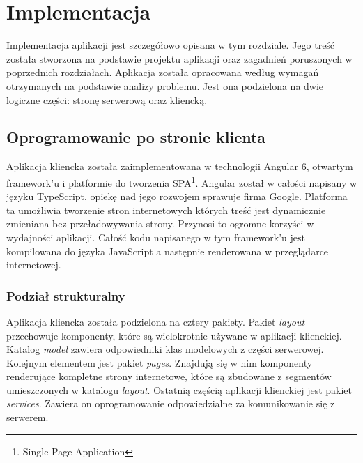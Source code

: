 \documentclass[12pt, twoside]{report}
\begin{document}
\chapter{Implementacja}
Implementacja aplikacji jest szczegółowo opisana w tym rozdziale. Jego treść została stworzona na podstawie projektu aplikacji oraz zagadnień poruszonych w poprzednich rozdziałach. Aplikacja została opracowana według wymagań otrzymanych na podstawie analizy problemu. Jest ona podzielona na dwie logiczne części: stronę serwerową oraz kliencką. 

\section{Oprogramowanie po stronie klienta}
Aplikacja kliencka została zaimplementowana w technologii Angular 6, otwartym framework'u i platformie do tworzenia SPA\footnote{Single Page Application}. Angular został w całości napisany w języku TypeScript, opiekę nad jego rozwojem sprawuje firma Google. Platforma ta umożliwia tworzenie stron internetowych których treść jest dynamicznie zmieniana bez przeładowywania strony. Przynosi to ogromne korzyści w wydajności aplikacji. Całość kodu napisanego w tym framework'u jest kompilowana do języka JavaScript a następnie renderowana w przeglądarce internetowej. 
\subsection{Podział strukturalny}
Aplikacja kliencka została podzielona na cztery pakiety. Pakiet \textit{layout} przechowuje komponenty, które są wielokrotnie używane w aplikacji klienckiej. Katalog \textit{model} zawiera odpowiedniki klas modelowych z części serwerowej. Kolejnym elementem jest pakiet \textit{pages}. Znajdują się w nim komponenty renderujące kompletne strony internetowe, które są zbudowane z segmentów umieszczonych w katalogu \textit{layout}. Ostatnią częścią aplikacji klienckiej jest pakiet \textit{services}. Zawiera on oprogramowanie odpowiedzialne za komunikowanie się z serwerem. 
\end{document}
